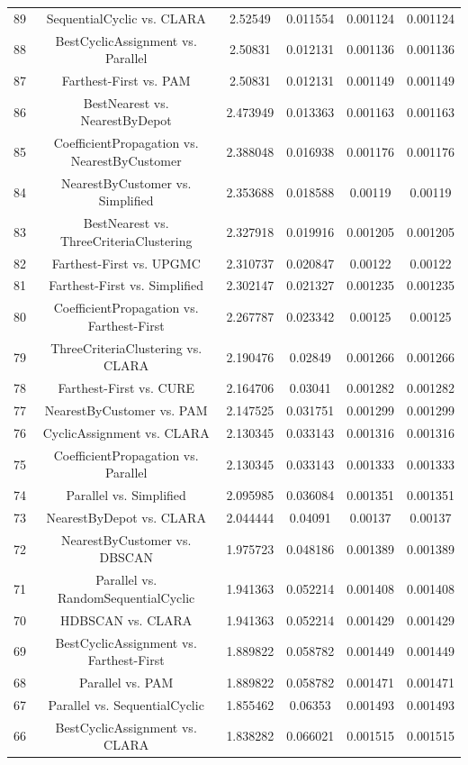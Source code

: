 \documentclass[a4paper,10pt]{article}
\begin{document}
\begin{landscape}
\begin{table}[!htp]
\begin{tabular}{cccccc}
89&SequentialCyclic vs. CLARA&2.52549&0.011554&0.001124&0.001124\\
88&BestCyclicAssignment vs. Parallel&2.50831&0.012131&0.001136&0.001136\\
87&Farthest-First vs. PAM&2.50831&0.012131&0.001149&0.001149\\
86&BestNearest vs. NearestByDepot&2.473949&0.013363&0.001163&0.001163\\
85&CoefficientPropagation vs. NearestByCustomer&2.388048&0.016938&0.001176&0.001176\\
84&NearestByCustomer vs. Simplified&2.353688&0.018588&0.00119&0.00119\\
83&BestNearest vs. ThreeCriteriaClustering&2.327918&0.019916&0.001205&0.001205\\
82&Farthest-First vs. UPGMC&2.310737&0.020847&0.00122&0.00122\\
81&Farthest-First vs. Simplified&2.302147&0.021327&0.001235&0.001235\\
80&CoefficientPropagation vs. Farthest-First&2.267787&0.023342&0.00125&0.00125\\
79&ThreeCriteriaClustering vs. CLARA&2.190476&0.02849&0.001266&0.001266\\
78&Farthest-First vs. CURE&2.164706&0.03041&0.001282&0.001282\\
77&NearestByCustomer vs. PAM&2.147525&0.031751&0.001299&0.001299\\
76&CyclicAssignment vs. CLARA&2.130345&0.033143&0.001316&0.001316\\
75&CoefficientPropagation vs. Parallel&2.130345&0.033143&0.001333&0.001333\\
74&Parallel vs. Simplified&2.095985&0.036084&0.001351&0.001351\\
73&NearestByDepot vs. CLARA&2.044444&0.04091&0.00137&0.00137\\
72&NearestByCustomer vs. DBSCAN&1.975723&0.048186&0.001389&0.001389\\
71&Parallel vs. RandomSequentialCyclic&1.941363&0.052214&0.001408&0.001408\\
70&HDBSCAN vs. CLARA&1.941363&0.052214&0.001429&0.001429\\
69&BestCyclicAssignment vs. Farthest-First&1.889822&0.058782&0.001449&0.001449\\
68&Parallel vs. PAM&1.889822&0.058782&0.001471&0.001471\\
67&Parallel vs. SequentialCyclic&1.855462&0.06353&0.001493&0.001493\\
66&BestCyclicAssignment vs. CLARA&1.838282&0.066021&0.001515&0.001515\\

\end{tabular}
\end{table}
\end{landscape}
\end{document}
